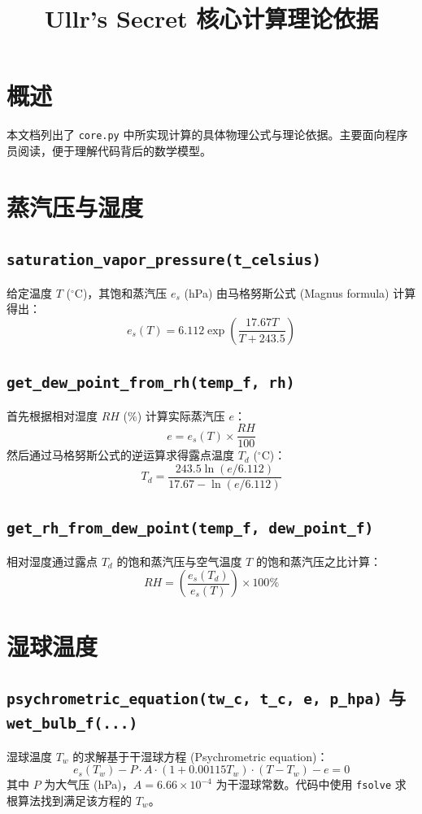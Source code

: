 \documentclass[11pt]{article}
\title{Ullr's Secret 核心计算理论依据}
\author{}
\date{}
\begin{document}
\maketitle

\section*{概述}
本文档列出了 \texttt{core.py} 中所实现计算的具体物理公式与理论依据。主要面向程序员阅读，便于理解代码背后的数学模型。

\section{蒸汽压与湿度}
\subsection{\texttt{saturation\_vapor\_pressure(t\_celsius)}}
给定温度 $T$ ($^\circ\text{C}$)，其饱和蒸汽压 $e_s$ (hPa) 由马格努斯公式 (Magnus formula) 计算得出：
\[
e_s(T) = 6.112 \exp\left(\frac{17.67 T}{T + 243.5}\right)
\]

\subsection{\texttt{get\_dew\_point\_from\_rh(temp\_f, rh)}}
首先根据相对湿度 $RH$ (\%) 计算实际蒸汽压 $e$：
\[
e = e_s(T) \times \frac{RH}{100}
\]
然后通过马格努斯公式的逆运算求得露点温度 $T_d$ ($^\circ\text{C}$)：
\[
T_d = \frac{243.5 \ln(e / 6.112)}{17.67 - \ln(e / 6.112)}
\]

\subsection{\texttt{get\_rh\_from\_dew\_point(temp\_f, dew\_point\_f)}}
相对湿度通过露点 $T_d$ 的饱和蒸汽压与空气温度 $T$ 的饱和蒸汽压之比计算：
\[
RH = \left( \frac{e_s(T_d)}{e_s(T)} \right) \times 100\%
\]

\section{湿球温度}
\subsection{\texttt{psychrometric\_equation(tw\_c, t\_c, e, p\_hpa)} 与 \texttt{wet\_bulb\_f(...)}}
湿球温度 $T_w$ 的求解基于干湿球方程 (Psychrometric equation)：
\[
e_s(T_w) - P \cdot A \cdot (1 + 0.00115 T_w) \cdot (T - T_w) - e = 0
\]
其中 $P$ 为大气压 (hPa)，$A = 6.66 \times 10^{-4}$ 为干湿球常数。代码中使用 \texttt{fsolve} 求根算法找到满足该方程的 $T_w$。
\end{document}
